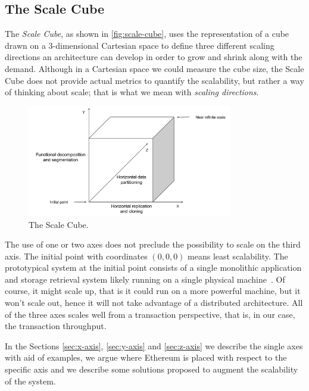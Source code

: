 \subsection{The Scale Cube}
\label{sec:scale-cube}

The \emph{Scale Cube}, as shown in \autoref{fig:scale-cube}, uses the
representation of a cube drawn on a 3-dimensional Cartesian space to define
three different scaling directions an architecture can develop in order to
grow and shrink along with the demand. Although in a Cartesian space we could
measure the cube size, the Scale Cube does not provide actual metrics to
quantify the scalability, but rather a way of thinking about scale; that is what we
mean with \emph{scaling directions}.

\begin{figure}[h]
	\begin{center}
		\includegraphics[width=0.8\textwidth]{./res/img/scale-cube.pdf}
	\end{center}
	\caption{The Scale Cube.}
	\label{fig:scale-cube}
\end{figure}

The use of one or two axes does not preclude the possibility to scale on the
third axis. The initial point with coordinates $(0,0,0)$ means least
scalability. The prototypical system at the initial point consists of a single
monolithic application and storage retrieval system likely running on a single
physical machine~\cite{bib:art-of-scalability}. Of course, it might scale up,
that is it could run on a more powerful machine, but it won't scale out, hence
it will not take advantage of a distributed architecture. All of the three axes
scales well from a transaction perspective, that is, in our case, the
transaction throughput.

In the Sections \ref{sec:x-axis}, \ref{sec:y-axis} and \ref{sec:z-axis} we
describe the single axes with aid of examples, we argue where Ethereum is placed
with respect to the specific axis and we describe some solutions proposed to
augment the scalability of the system.
